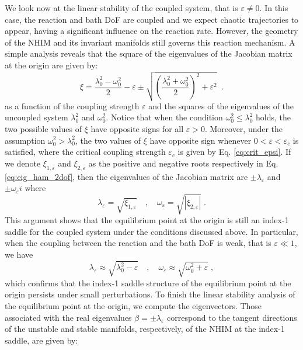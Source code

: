 \documentclass[8pt]{article}
\begin{document}
We look now at the linear stability of the coupled system, that is $\varepsilon \neq 0$. In this case, the reaction and bath DoF are coupled and we expect  chaotic trajectories to appear, having a significant influence on the reaction rate. However, the geometry of the NHIM and its invariant manifolds still governs this reaction mechanism. A simple analysis reveals that the square of the eigenvalues of the Jacobian matrix at the origin are given by:
\begin{equation}
\xi =\dfrac{\lambda_0^2 - \omega_0^2}{2} - \varepsilon \pm \sqrt{\left(\dfrac{\lambda_0^2 + \omega_0^2}{2}\right)^2 + \varepsilon^2} \;\;.
\label{eq:eig_ham_2dof}
\end{equation}
as a function of the coupling strength $\varepsilon$ and the squares of the eigenvalues of the uncoupled system $\lambda_0^2$ and $\omega_0^2$. Notice that when the condition $\omega_0^2 \leq \lambda_0^2$ holds, the two possible values of $\xi$ have opposite signs for all $\varepsilon > 0$. Moreover, under the assumption $\omega_0^2 > \lambda_0^2$, the two values of $\xi$ have opposite sign whenever $0 < \varepsilon < \varepsilon_c$ is satisfied, where the critical coupling strength $\varepsilon_c$ is given by Eq. \eqref{eq:crit_epsi}. If we denote $\xi_{1,\varepsilon}$ and $\xi_{2,\varepsilon}$ as the positive and negative roots respectively in Eq. \eqref{eq:eig_ham_2dof}, then the eigenvalues of the Jacobian matrix are $\pm \lambda_\varepsilon$ and $\pm \omega_\varepsilon i$ where
\begin{equation}
\lambda_\varepsilon = \sqrt{\xi_{1,\varepsilon}} \quad,\quad \omega_\varepsilon = \sqrt{|\xi_{2,\varepsilon}|} \;.
\label{eq:eigenvalues_2dof}
\end{equation}
This argument shows that the equilibrium point at the origin is still an index-1 saddle for the coupled system under the conditions discussed above. In particular, when the coupling between the reaction and the bath DoF is weak, that is $\varepsilon \ll 1$, we have 
\begin{equation}
\lambda_\varepsilon \approx \sqrt{\lambda_0^2 - \varepsilon} \quad,\quad \omega_\varepsilon \approx \sqrt{\omega_0^2 + \varepsilon} \;,
\end{equation}
which confirms that the index-1 saddle structure of the equilibrium point at the origin persists under small perturbations. To finish the linear stability analysis of the equilibrium point at the origin, we compute the eigenvectors. Those associated with the real eigenvalues $\beta = \pm \lambda_{\varepsilon}$ correspond to the tangent directions of the unstable and stable manifolds, respectively, of the NHIM at the index-1 saddle, are given by:
\end{document}
